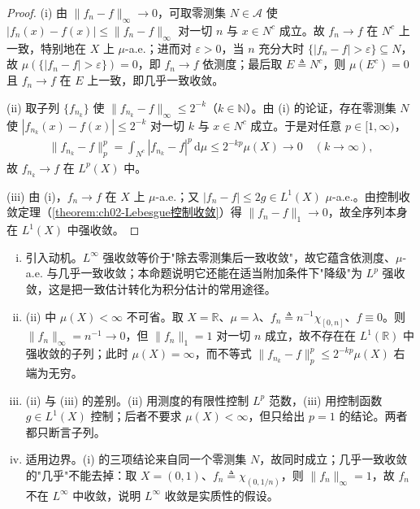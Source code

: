 \documentclass[../../main.tex]{subfiles}%
\begin{document}
\begin{proof}
(i) 由 $\|f_n-f\|_\infty\to0$，可取零测集 $N\in\mathscr A$ 使 $|f_n(x)-f(x)|\leqslant\|f_n-f\|_\infty$ 对一切 $n$ 与 $x\in N^c$ 成立。故 $f_n\to f$ 在 $N^c$ 上一致，特别地在 $X$ 上 $\mu$-a.e.；进而对 $\varepsilon>0$，当 $n$ 充分大时 $\{|f_n-f|>\varepsilon\}\subseteq N$，故 $\mu(\{|f_n-f|>\varepsilon\})=0$，即 $f_n\to f$ 依测度；最后取 $E\triangleq N^c$，则 $\mu(E^c)=0$ 且 $f_n\to f$ 在 $E$ 上一致，即几乎一致收敛。

(ii) 取子列 $\{f_{n_k}\}$ 使 $\|f_{n_k}-f\|_\infty\leqslant2^{-k}$（$k\in\mathbb N$）。由 (i) 的论证，存在零测集 $N$ 使 $|f_{n_k}(x)-f(x)|\leqslant2^{-k}$ 对一切 $k$ 与 $x\in N^c$ 成立。于是对任意 $p\in[1,\infty)$，
\begin{align*}
\|f_{n_k}-f\|_p^p=\int_{N^c}|f_{n_k}-f|^p\,\mathrm{d}\mu\leqslant2^{-kp}\mu(X)\to0\quad(k\to\infty),
\end{align*}
故 $f_{n_k}\to f$ 在 $L^p(X)$ 中。

(iii) 由 (i)，$f_n\to f$ 在 $X$ 上 $\mu$-a.e.；又 $|f_n-f|\leqslant2g\in L^1(X)$ $\mu$-a.e.。由控制收敛定理（\cref{theorem:ch02-Lebesgue控制收敛}）得 $\|f_n-f\|_1\to0$，故全序列本身在 $L^1(X)$ 中强收敛。
\end{proof}

\begin{remark}\label{remark:ch02-Linfty强收敛}
\begin{enumerate}[(i)]
\item 引入动机。$L^\infty$ 强收敛等价于"除去零测集后一致收敛"，故它蕴含依测度、$\mu$-a.e. 与几乎一致收敛；本命题说明它还能在适当附加条件下"降级"为 $L^p$ 强收敛，这是把一致估计转化为积分估计的常用途径。
\item (ii) 中 $\mu(X)<\infty$ 不可省。取 $X=\mathbb R$、$\mu=\lambda$、$f_n\triangleq n^{-1}\chi_{[0,n]}$、$f\equiv0$。则 $\|f_n\|_\infty=n^{-1}\to0$，但 $\|f_n\|_1=1$ 对一切 $n$ 成立，故不存在在 $L^1(\mathbb R)$ 中强收敛的子列；此时 $\mu(X)=\infty$，而不等式 $\|f_{n_k}-f\|_p^p\leqslant2^{-kp}\mu(X)$ 右端为无穷。
\item (ii) 与 (iii) 的差别。(ii) 用测度的有限性控制 $L^p$ 范数，(iii) 用控制函数 $g\in L^1(X)$ 控制；后者不要求 $\mu(X)<\infty$，但只给出 $p=1$ 的结论。两者都只断言子列。
\item 适用边界。(i) 的三项结论来自同一个零测集 $N$，故同时成立；几乎一致收敛的"几乎"不能去掉：取 $X=(0,1)$、$f_n\triangleq\chi_{(0,1/n)}$，则 $\|f_n\|_\infty=1$，故 $f_n$ 不在 $L^\infty$ 中收敛，说明 $L^\infty$ 收敛是实质性的假设。
\end{enumerate}
\end{remark}
\end{document}
